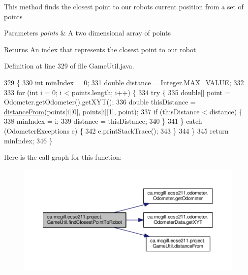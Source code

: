 This method finds the closest point to our robot\textquotesingle{}s current position from a set of points


\begin{DoxyParams}{Parameters}
{\em points} & A two dimensional array of points \\
\hline
\end{DoxyParams}
\begin{DoxyReturn}{Returns}
An index that represents the closest point to our robot 
\end{DoxyReturn}


Definition at line 329 of file Game\+Util.\+java.


\begin{DoxyCode}
329                                                             \{
330     \textcolor{keywordtype}{int} minIndex = 0;
331     \textcolor{keywordtype}{double} distance = Integer.MAX\_VALUE;
332 
333     \textcolor{keywordflow}{for} (\textcolor{keywordtype}{int} i = 0; i < points.length; i++) \{
334       \textcolor{keywordflow}{try} \{
335         \textcolor{keywordtype}{double}[] point = Odometer.getOdometer().getXYT();
336         \textcolor{keywordtype}{double} thisDistance = \hyperlink{classca_1_1mcgill_1_1ecse211_1_1project_1_1_game_util_a6fb324a3d5e42414c83dfd8bd5910b56}{distanceFrom}(points[i][0], points[i][1], point);
337         \textcolor{keywordflow}{if} (thisDistance < distance) \{
338           minIndex = i;
339           distance = thisDistance;
340         \}
341       \} \textcolor{keywordflow}{catch} (OdometerExceptions e) \{
342         e.printStackTrace();
343       \}
344     \}
345     \textcolor{keywordflow}{return} minIndex;
346   \}
\end{DoxyCode}
Here is the call graph for this function\+:\nopagebreak
\begin{figure}[H]
\begin{center}
\leavevmode
\includegraphics[width=350pt]{classca_1_1mcgill_1_1ecse211_1_1project_1_1_game_util_a6e0ee94b800ca3727ca8009782abda14_cgraph}
\end{center}
\end{figure}
